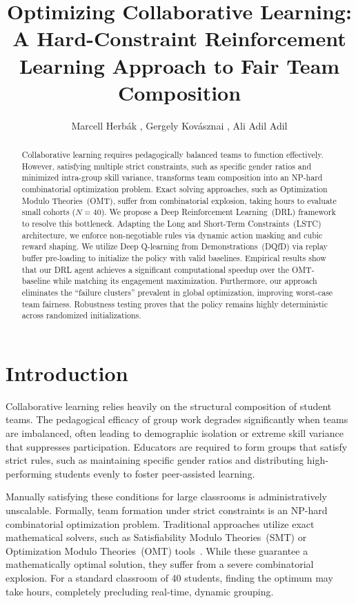 \documentclass{icai2026} %
\title{Optimizing Collaborative Learning: A Hard-Constraint Reinforcement Learning Approach to Fair Team Composition}
\author{Marcell Herbák \inst{1},
        Gergely Kovásznai \inst{1},
        Ali Adil Adil \inst{2}}
\institute{\inst{1} Eszterházy Károly Catholic University\\ \email{herbak.marcell@uni-eszterhazy.hu} \\
\email{kovasznai.gergely@uni-eszterhazy.hu}
           \inst{2} University of Debrecen\\ \email{ali.adil@unideb.hu}}
\begin{document}
\maketitle

\begin{abstract}
Collaborative learning requires pedagogically balanced teams to function effectively. However, satisfying multiple strict constraints, such as specific gender ratios and minimized intra-group skill variance, transforms team composition into an NP-hard combinatorial optimization problem. Exact solving approaches, such as Optimization Modulo Theories~(OMT), suffer from combinatorial explosion, taking hours to evaluate small cohorts ($N=40$). We propose a Deep Reinforcement Learning~(DRL) framework to resolve this bottleneck. Adapting the Long and Short-Term Constraints~(LSTC) architecture, we enforce non-negotiable rules via dynamic action masking and cubic reward shaping. We utilize Deep Q-learning from Demonstrations~(DQfD) via replay buffer pre-loading to initialize the policy with valid baselines. Empirical results show that our DRL agent achieves a significant computational speedup over the OMT-baseline while matching its engagement maximization. Furthermore, our approach eliminates the ``failure clusters'' prevalent in global optimization, improving worst-case team fairness. Robustness testing proves that the policy remains highly deterministic across randomized initializations.
\end{abstract}

\section{Introduction}\label{section:intro}

Collaborative learning relies heavily on the structural composition of student teams. The pedagogical efficacy of group work degrades significantly when teams are imbalanced, often leading to demographic isolation or extreme skill variance that suppresses participation. Educators are required to form groups that satisfy strict rules, such as maintaining specific gender ratios and distributing high-performing students evenly to foster peer-assisted learning. 

Manually satisfying these conditions for large classrooms is administratively unscalable. Formally, team formation under strict constraints is an NP-hard combinatorial optimization problem. Traditional approaches utilize exact mathematical solvers, such as Satisfiability Modulo Theories~(SMT) or Optimization Modulo Theories~(OMT) tools~\cite{DeMoura2008, SMT, OMT}. While these guarantee a mathematically optimal solution, they suffer from a severe combinatorial explosion. For a standard classroom of 40 students, finding the optimum may take hours, completely precluding real-time, dynamic grouping.
\end{document}
